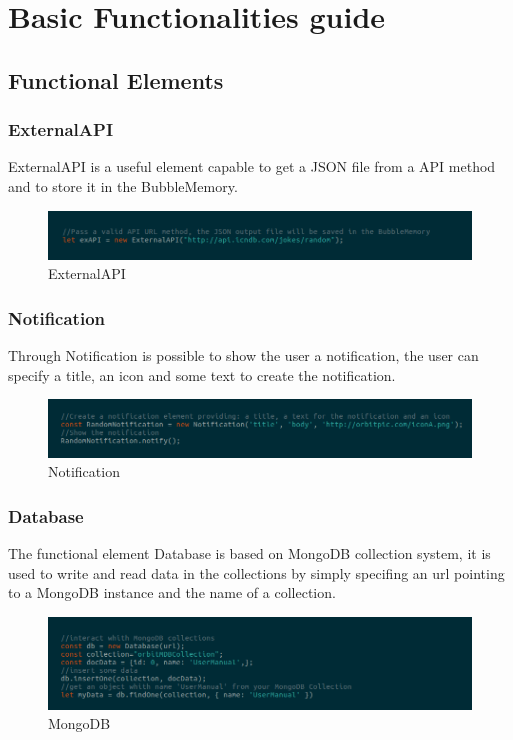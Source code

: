 \section{Basic Functionalities guide}
\subsection{Functional Elements}
\subsubsection{ExternalAPI}
ExternalAPI is a useful element capable to get a JSON file from a API method and to store it in the BubbleMemory. 
\begin{figure}[H]
	\centering
	\includegraphics[width=14cm]{../../documenti/UserManualFramework/framework_model/1framework_model_api.png}
	\caption{ExternalAPI}
\end{figure}

\subsubsection{Notification}
Through Notification is possible to show the user a notification, the user can specify a title, an icon and some text to create the notification. 
\begin{figure}[H]
	\centering
	\includegraphics[width=14cm]{../../documenti/UserManualFramework/framework_model/2framework_model_notification.png}
	\caption{Notification}
\end{figure}

\subsubsection{Database}
The functional element Database is based on MongoDB collection system, it is used to write and read data in the collections by simply specifing an url pointing to a MongoDB instance and the name of a collection.
\begin{figure}[H]
	\centering
	\includegraphics[width=14cm]{../../documenti/UserManualFramework/framework_model/3framework_model_mongo.png}
	\caption{MongoDB}
\end{figure}

